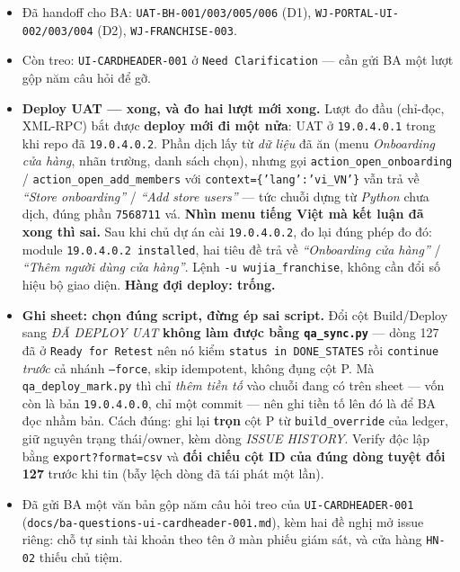 \begin{itemize}
\item Đã handoff cho BA: \texttt{UAT-BH-001/003/005/006} (D1),
  \texttt{WJ-PORTAL-UI-002/003/004} (D2), \texttt{WJ-FRANCHISE-003}.
\item Còn treo: \texttt{UI-CARDHEADER-001} ở \texttt{Need Clarification} --- cần gửi BA một
  lượt gộp năm câu hỏi để gỡ.
\item \textbf{Deploy UAT --- xong, và đo hai lượt mới xong.} Lượt đo đầu (chỉ-đọc, XML-RPC)
  bắt được \textbf{deploy mới đi một nửa}: UAT ở \texttt{19.0.4.0.1} trong khi repo đã
  \texttt{19.0.4.0.2}. Phần dịch lấy từ \emph{dữ liệu} đã ăn (menu \emph{Onboarding cửa hàng},
  nhãn trường, danh sách chọn), nhưng gọi \texttt{action\_open\_onboarding} /
  \texttt{action\_open\_add\_members} với \texttt{context=\{'lang':'vi\_VN'\}} vẫn trả về
  \emph{``Store onboarding''} / \emph{``Add store users''} --- tức chuỗi dựng từ \emph{Python}
  chưa dịch, đúng phần \texttt{7568711} vá. \textbf{Nhìn menu tiếng Việt mà kết luận đã xong
  thì sai.} Sau khi chủ dự án cài \texttt{19.0.4.0.2}, đo lại đúng phép đo đó: module
  \texttt{19.0.4.0.2 installed}, hai tiêu đề trả về \emph{``Onboarding cửa hàng''} /
  \emph{``Thêm người dùng cửa hàng''}. Lệnh \texttt{-u wujia\_franchise}, không cần đổi số hiệu
  bộ giao diện. \textbf{Hàng đợi deploy: trống.}
\item \textbf{Ghi sheet: chọn đúng script, đừng ép sai script.} Đổi cột Build/Deploy sang
  \emph{ĐÃ DEPLOY UAT} \textbf{không làm được bằng \texttt{qa\_sync.py}} --- dòng 127 đã ở
  \texttt{Ready for Retest} nên nó kiểm \texttt{status in DONE\_STATES} rồi \texttt{continue}
  \emph{trước} cả nhánh \texttt{--force}, skip idempotent, không đụng cột P. Mà
  \texttt{qa\_deploy\_mark.py} thì chỉ \emph{thêm tiền tố} vào chuỗi đang có trên sheet --- vốn
  còn là bản \texttt{19.0.4.0.0}, chỉ một commit --- nên ghi tiền tố lên đó là để BA đọc nhầm
  bản. Cách đúng: ghi lại \textbf{trọn} cột P từ \texttt{build\_override} của ledger, giữ
  nguyên trạng thái/owner, kèm dòng \emph{ISSUE HISTORY}. Verify độc lập bằng
  \texttt{export?format=csv} và \textbf{đối chiếu cột ID của đúng dòng tuyệt đối 127} trước khi
  tin (bẫy lệch dòng đã tái phát một lần).
\item Đã gửi BA một văn bản gộp năm câu hỏi treo của \texttt{UI-CARDHEADER-001}
  (\texttt{docs/ba-questions-ui-cardheader-001.md}), kèm hai đề nghị mở issue riêng: chỗ tự
  sinh tài khoản theo tên ở màn phiếu giám sát, và cửa hàng \texttt{HN-02} thiếu chủ tiệm.
\end{itemize}
